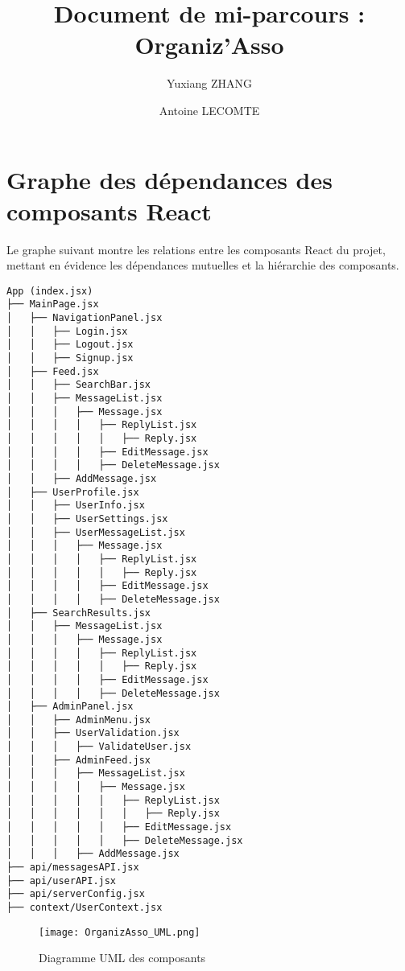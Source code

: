 \documentclass{article}
\title{Document de mi-parcours : Organiz'Asso}
\author{Yuxiang ZHANG \and Antoine LECOMTE}
\date{}
\begin{document}
\maketitle

\section*{Graphe des dépendances des composants React}
Le graphe suivant montre les relations entre les composants React du projet, mettant en évidence les dépendances mutuelles et la hiérarchie des composants.

\begin{lstlisting}[caption={Structure des composants React}]
App (index.jsx)
├── MainPage.jsx
│   ├── NavigationPanel.jsx
│   │   ├── Login.jsx
│   │   ├── Logout.jsx
│   │   ├── Signup.jsx
│   ├── Feed.jsx
│   │   ├── SearchBar.jsx
│   │   ├── MessageList.jsx
│   │   │   ├── Message.jsx
│   │   │   │   ├── ReplyList.jsx
│   │   │   │   │   ├── Reply.jsx
│   │   │   │   ├── EditMessage.jsx
│   │   │   │   ├── DeleteMessage.jsx
│   │   ├── AddMessage.jsx
│   ├── UserProfile.jsx
│   │   ├── UserInfo.jsx
│   │   ├── UserSettings.jsx
│   │   ├── UserMessageList.jsx
│   │   │   ├── Message.jsx
│   │   │   │   ├── ReplyList.jsx
│   │   │   │   │   ├── Reply.jsx
│   │   │   │   ├── EditMessage.jsx
│   │   │   │   ├── DeleteMessage.jsx
│   ├── SearchResults.jsx
│   │   ├── MessageList.jsx
│   │   │   ├── Message.jsx
│   │   │   │   ├── ReplyList.jsx
│   │   │   │   │   ├── Reply.jsx
│   │   │   │   ├── EditMessage.jsx
│   │   │   │   ├── DeleteMessage.jsx
│   ├── AdminPanel.jsx
│   │   ├── AdminMenu.jsx
│   │   ├── UserValidation.jsx
│   │   │   ├── ValidateUser.jsx
│   │   ├── AdminFeed.jsx
│   │   │   ├── MessageList.jsx
│   │   │   │   ├── Message.jsx
│   │   │   │   │   ├── ReplyList.jsx
│   │   │   │   │   │   ├── Reply.jsx
│   │   │   │   │   ├── EditMessage.jsx
│   │   │   │   │   ├── DeleteMessage.jsx
│   │   │   ├── AddMessage.jsx
├── api/messagesAPI.jsx
├── api/userAPI.jsx
├── api/serverConfig.jsx
├── context/UserContext.jsx
\end{lstlisting}

\vspace{1cm} %

\begin{figure}[h]
    \centering
    \texttt{[image: OrganizAsso\_UML.png]}
    \caption{Diagramme UML des composants}
    \label{fig:uml_diagram}
\end{figure}
\end{document}
